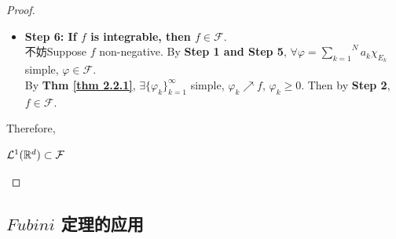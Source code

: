 \begin{proof}
\begin{itemize}
 			\newpage
 			
 			\item \textbf{Step 6: If $f$ is integrable, then $f \in \mathcal{F}$}. \\
 			不妨Suppose $f$ non-negative. By \textbf{Step 1 and Step 5}, $\forall \varphi = \overset{N}{\underset{k = 1}{\sum}}{a_k \chi_{E_k}}$ simple, $\varphi \in \mathcal{F}$. \\
 			By \textbf{Thm \ref{thm 2.2.1}}, $\exists \{ \varphi_{k} \}_{k = 1}^{\infty}$ simple, $\varphi_k \nearrow f$, $\varphi_k \geq 0$. Then by \textbf{Step 2}, $f \in \mathcal{F}$.
		\end{itemize}
	
		\vspace{2em}
		
		Therefore, 
		\begin{center}
			$\mathcal{L}^{1}(\mathbb{R}^d) \subset \mathcal{F}$
		\end{center}
	\end{proof}

\newpage
\subsection{$Fubini$ 定理的应用}
	


	\ifx\allfiles\undefined

\fi